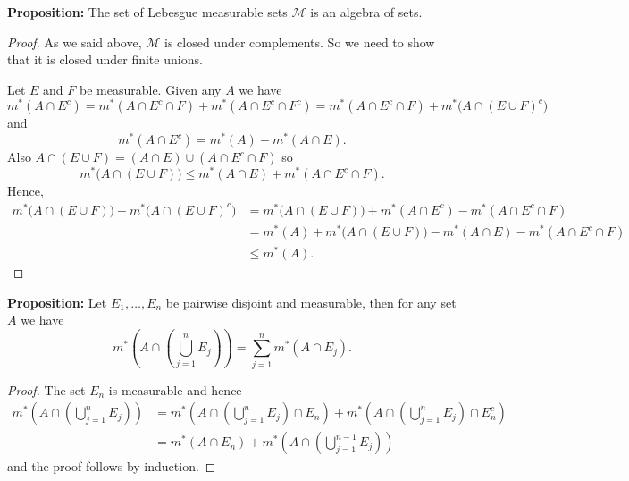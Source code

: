\documentclass[12pt]{book}
\newcommand{\sM}{{\mathcal{M}}}
\theoremstyle{plain}
\theoremstyle{remark}
\theoremstyle{definition}
\theoremstyle{exercise}
\theoremstyle{example}
\begin{document}
\medskip

\textbf{Proposition:}
The set of Lebesgue measurable sets
$\sM$ is an algebra of sets.

\medskip

\begin{proof}
As we said above, $\sM$ is closed under complements.  So we need to show that
it is closed under finite unions.

Let $E$ and $F$ be measurable.
Given any $A$ we have
$$
m^*(A \cap E^c) =
m^*(A \cap E^c \cap F) +
m^*(A \cap E^c \cap F^c)
=
m^*(A \cap E^c \cap F) +
m^*\bigl(A \cap ( E \cup F)^c \bigr)
$$
and
$$
m^*(A \cap E^c)
=
m^*(A) -
m^*(A \cap E) .
$$
Also
$A \cap (E \cup F) = (A \cap E) \cup (A \cap E^c \cap F)$ so
$$
m^*\bigl(A \cap (E \cup F) \bigr)
\leq
m^*(A \cap E ) +
m^*(A \cap E^c \cap F ) .
$$
Hence,
\begin{equation*}
\begin{split}
m^*\bigl(A \cap (E \cup F) \bigr) +
m^*\bigl(A \cap (E \cup F)^c \bigr)
& =
m^*\bigl(A \cap (E \cup F) \bigr) +
m^*(A \cap E^c ) -
m^*(A \cap E^c \cap F )
\\
& =
m^*(A)
+
m^*\bigl(A \cap (E \cup F) \bigr)
-
m^*(A \cap E ) -
m^*(A \cap E^c \cap F )
\\
& \leq
m^*(A) .
\end{split}
\end{equation*}
\end{proof}

\medskip

\textbf{Proposition:}
Let $E_1, \ldots, E_n$ be pairwise disjoint and measurable, then
for any set $A$ we have
$$
m^*\left( A \cap \left( \bigcup_{j=1}^n E_j \right) \right)
=
\sum_{j=1}^n
m^*( A \cap  E_j ) .
$$

\medskip

\begin{proof}
The set $E_n$ is measurable and hence
\begin{equation*}
\begin{split}
m^*\left( A \cap \left( \bigcup_{j=1}^n E_j \right) \right)
& =
m^*\left( A \cap \left( \bigcup_{j=1}^n E_j \right) \cap E_n \right)
+
m^*\left( A \cap \left( \bigcup_{j=1}^n E_j \right) \cap E_n^c \right)
\\
& =
m^*( A \cap E_n )
+
m^*\left( A \cap \left( \bigcup_{j=1}^{n-1} E_j \right) \right)
\end{split}
\end{equation*}
and the proof follows by induction.
\end{proof}
\end{document}

